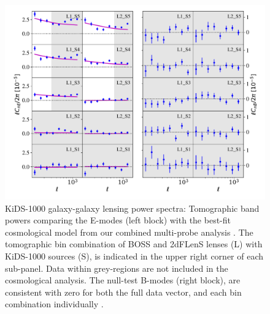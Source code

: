 \begin{figure}
        \includegraphics[width=\textwidth]{Data_Plots/Pgk/Pgk_K1000_2Dbins_v2_goldclasses_Flag_SOM_Fid_A.pdf}
        \caption{KiDS-1000 galaxy-galaxy lensing power spectra:
          Tomographic band powers comparing the E-modes (left block)
          with the best-fit
          cosmological model from our combined multi-probe analysis
          .  The tomographic 
        bin combination of BOSS and 2dFLenS lenses (L) with KiDS-1000
        sources (S), is indicated in the upper right corner of each
        sub-panel.  Data within grey-regions are not included in the cosmological analysis.
        The null-test B-modes (right block), are
      consistent with zero for both the full data vector, and each
     bin combination individually .}
        \label{fig:Pgk}
\end{figure}



